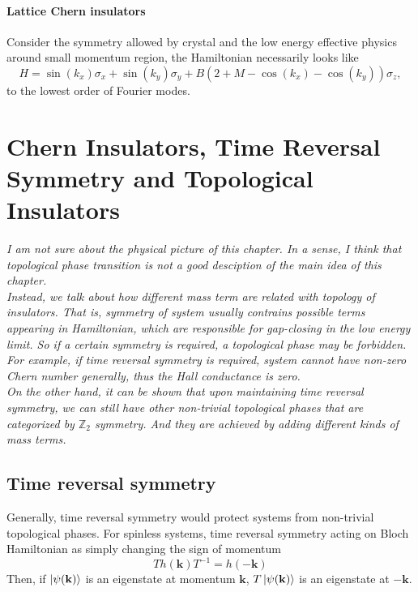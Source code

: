 \documentclass[12pt,a4paper]{article}
\numberwithin{equation}{section}
\begin{document}
\paragraph{Lattice Chern insulators}
Consider the symmetry allowed by crystal and the low energy effective physics around small momentum region, the Hamiltonian necessarily looks like
\begin{equation}
    H = \sin (k_x) \sigma_x + \sin (k_y) \sigma_y + B(2+M-\cos(k_x)-\cos(k_y))\sigma_z,
\end{equation}
to the lowest order of Fourier modes.



\section{Chern Insulators, Time Reversal Symmetry and Topological Insulators}


\textit{I am not sure about the physical picture of this chapter. In a sense, I think that topological phase transition is not a good desciption of 
the main idea of this chapter. \\
Instead, we talk about how different mass term are related with topology of insulators. That is, symmetry of system
usually contrains possible terms appearing in Hamiltonian, which are responsible for gap-closing in the low energy limit. So if a certain symmetry is 
required, a topological phase may be forbidden. For example, if time reversal symmetry is required, system cannot have non-zero Chern number generally, 
thus the Hall conductance is zero. \\
On the other hand, it can be shown that upon maintaining time reversal symmetry, we can still have other non-trivial topological phases that are categorized
by $\mathbb{Z}_2$ symmetry. And they are achieved by adding different kinds of mass terms.}



\subsection{Time reversal symmetry}
Generally, time reversal symmetry would protect systems from non-trivial topological phases.
For spinless systems, time reversal symmetry acting on Bloch Hamiltonian as simply changing the sign of momentum
\begin{equation}
    T h(\mathbf{k}) T^{-1} = h(-\mathbf{k})
\end{equation}
Then, if $\ket{\psi(\mathbf{k})}$ is an eigenstate at momentum $\mathbf{k}$, $T\ket{\psi(\mathbf{k})}$ is an eigenstate at $-\mathbf{k}$.
\end{document}

